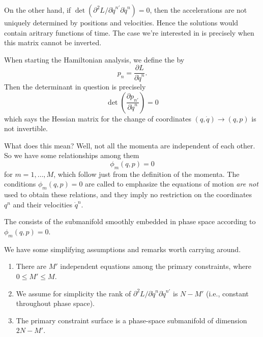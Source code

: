 \M
On the other hand, if
$\det(\partial^{2}L/\partial\dot{q}^{n'}\partial\dot{q}^{n})=0$, then the
accelerations are not uniquely determined by positions and
velocities. Hence the solutions would contain aritrary functions of
time. The case we're interested in is precisely when this matrix cannot
be inverted.

When starting the Hamiltonian analysis, we define the 
by
\begin{equation}
  p_{n}=\frac{\partial L}{\partial\dot{q}^{n}}.
\end{equation}
Then the determinant in question is precisely
\begin{equation}
  \det\left(\frac{\partial p_{n'}}{\partial\dot{q}^{n}}\right)=0
\end{equation}
which says the Hessian matrix for the change of coordinates
$(q,\dot{q})\to(q,p)$ is not invertible.

What does this mean? Well, not all the momenta are independent of each
other. So we have some relationships among them
\begin{equation}
  \phi_{m}(q,p)=0
\end{equation}
for $m=1,\dots,M$, which follow just from the definition of the
momenta. The conditions $\phi_{m}(q,p)=0$ are called  to emphasize the equations of motion \emph{are not} used
to obtain these relations, and they imply no restriction on the
coordinates $q^{n}$ and their velocities $\dot{q}^{n}$.

\begin{definition}
The  consists of the submanifold
smoothly embedded in phase space according to $\phi_{m}(q,p)=0$.
\end{definition}

We have some simplifying assumptions and remarks worth carrying around.
\begin{enumerate}
\item There are $M'$ independent equations among the primary
  constraints, where $0\leq M'\leq M$.
\item We assume for simplicity the rank of
  $\partial^{2}L/\partial\dot{q}^{n}\partial\dot{q}^{n'}$ is $N-M'$
  (i.e., constant throughout phase space).
\item The primary constraint surface is a phase-space submanifold of
  dimension $2N-M'$.
\end{enumerate}

